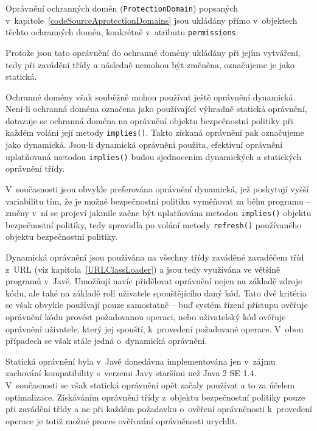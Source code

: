 Oprávnění ochranných domén ({\tt ProtectionDomain}) popsaných v~kapitole~\ref{codeSourceAprotectionDomains} jsou ukládány přímo v~objektech těchto ochranných domén,
konkrétně v~atributu {\tt permissions}.~\cite{sourceProtectionDomain}

Protože jsou tato oprávnění do ochranné domény ukládány při jejím vytváření, tedy při zavádění třídy a následně nemohou být změněna, označujeme je jako statická.

Ochranné domény však souběžně mohou používat ještě oprávnění dynamická. Není-li ochranná doména označena jako používající výhradně statická oprávnění,
dotazuje se ochranná doména na oprávnění objektu bezpečnostní politiky při každém volání její metody {\tt implies()}.
Takto získaná oprávnění pak označujeme jako dynamická.
Jsou-li dynamická oprávnění použita, efektivní oprávnění uplatňovaná metodou {\tt implies()} budou sjednocením dynamických a statických oprávnění třídy.
\cite{sourceProtectionDomain}

V~současnosti jsou obvykle preferována oprávnění dynamická, jež poskytují vyšší variabilitu tím, že je možné bezpečnostní politiku vyměňovat za běhu
programu -- změny v~ní se projeví jakmile začne být uplatňována metodou {\tt implies()} objektu bezpečnostní politiky, tedy zpravidla po volání metody
{\tt refresh()} používaného objektu bezpečnostní politiky.

Dynamická oprávnění jsou používána na všechny třídy zaváděné zavaděčem tříd z~URL (viz kapitola~\ref{URLClassLoader}) a jsou tedy využívána ve většině programů v~Javě.
\cite{sourceURLClassLoader}
Umožňují navíc přidělovat oprávnění nejen na základě zdroje kódu, ale také na základě rolí uživatele spouštějícího daný kód. Tato dvě kritéria se však
obvykle používají pouze samostatně -- buď systém řízení přístupu ověřuje oprávnění kódu provést požadovanou operaci, nebo uživatelský kód ověřuje oprávnění
uživatele, který jej spouští, k~provedení požadované operace. V~obou případech se však stále jedná o~dynamická oprávnění.

Statická oprávnění byla v~Javě donedávna implementována jen v~zájmu zachování kompatibility s~verzemi Javy staršími než Java 2 SE 1.4.~\cite{sourceProtectionDomain}
V~současnosti se však statická oprávnění opět začaly používat a to za účelem optimalizace.
Získáváním oprávnění třídy z~objektu bezpečnostní politiky pouze při zavádění třídy a ne při každém požadavku o~ověření oprávněnosti k~provedení operace je totiž možné proces ověřování oprávněnosti urychlit.

